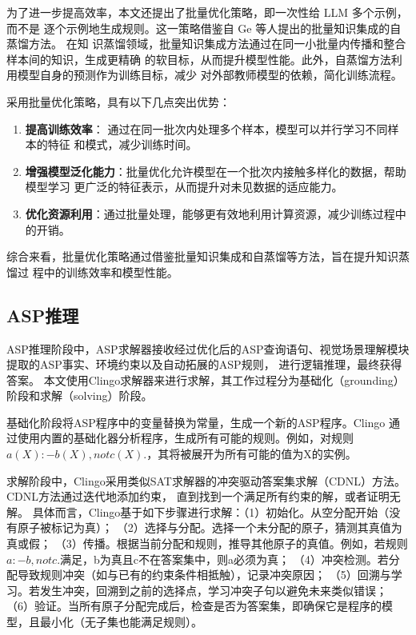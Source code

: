 为了进一步提高效率，本文还提出了批量优化策略，即一次性给 LLM 多个示例，而不是
逐个示例地生成规则。这一策略借鉴自 Ge\cite{ge2021selfdistillationbatchknowledgeensembling} 等人提出的批量知识集成的自蒸馏方法。 在知
识蒸馏领域，批量知识集成方法通过在同一小批量内传播和整合样本间的知识，生成更精确
的软目标，从而提升模型性能。此外，自蒸馏方法利用模型自身的预测作为训练目标，减少
对外部教师模型的依赖，简化训练流程。

采用批量优化策略，具有以下几点突出优势：
\begin{enumerate}[nosep]
\item \textbf{提高训练效率}： 通过在同一批次内处理多个样本，模型可以并行学习不同样本的特征
和模式，减少训练时间。
\item \textbf{增强模型泛化能力}：批量优化允许模型在一个批次内接触多样化的数据，帮助模型学习
更广泛的特征表示，从而提升对未见数据的适应能力。
\item \textbf{优化资源利用}：通过批量处理，能够更有效地利用计算资源，减少训练过程中的开销。
\end{enumerate}

综合来看，批量优化策略通过借鉴批量知识集成和自蒸馏等方法，旨在提升知识蒸馏过
程中的训练效率和模型性能。
\subsection{ASP推理}
ASP推理阶段中，ASP求解器接收经过优化后的ASP查询语句、视觉场景理解模块提取的ASP事实、环境约束以及自动拓展的ASP规则，
进行逻辑推理，最终获得答案。
本文使用Clingo求解器来进行求解，其工作过程分为基础化（grounding）阶段和求解（solving）阶段。

基础化阶段将ASP程序中的变量替换为常量，生成一个新的ASP程序。Clingo
通过使用内置的基础化器分析程序，生成所有可能的规则。例如，对规则
$a(X) :- b(X), not c(X).$，其将被展开为所有可能的值为X的实例。

求解阶段中，Clingo采用类似SAT求解器的冲突驱动答案集求解（CDNL）方法。CDNL方法通过迭代地添加约束，
直到找到一个满足所有约束的解，或者证明无解。
具体而言，Clingo基于如下步骤进行求解：（1）初始化。从空分配开始（没有原子被标记为真）；
（2）选择与分配。选择一个未分配的原子，猜测其真值为真或假；
（3）传播。根据当前分配和规则，推导其他原子的真值。例如，若规则$a :- b, not c.$满足，b为真且c不在答案集中，则a必须为真；
（4）冲突检测。若分配导致规则冲突（如与已有的约束条件相抵触），记录冲突原因；
（5）回溯与学习。若发生冲突，回溯到之前的选择点，学习冲突子句以避免未来类似错误；
（6）验证。当所有原子分配完成后，检查是否为答案集，即确保它是程序的模型，且最小化（无子集也能满足规则）。

